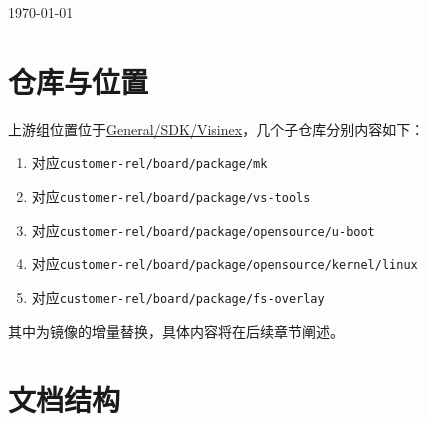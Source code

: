 \documentclass[UTF8]{ctexart}
\newcommand{\code}[1]{\colorbox{gray!10}{\lstinline[style=inlinecode]|#1|}}
\begin{document}
\vspace{\fill}

\begin{center}
    {\large \today}
\end{center}

\thispagestyle{empty}

\newpage
\pagestyle{plain}

\pagestyle{fancy}

\setlength{\headsep}{40pt}
\setlength{\footskip}{40pt}

\renewcommand\headrulewidth{.5pt}
\fancyhead{}

\renewcommand\footrulewidth{.5pt}
\fancyfoot{}
\fancyfoot[C]{\thepage}


\section*{仓库与位置}

上游组位置位于\href{http://192.168.110.252:12123/general/sdk/visinex}{General/SDK/Visinex}，几个子仓库分别内容如下：

\begin{enumerate}
    \item {}对应\code{customer-rel/board/package/mk}
    \item {}对应\code{customer-rel/board/package/vs-tools}
    \item {}对应\code{customer-rel/board/package/opensource/u-boot}
    \item {}对应\code{customer-rel/board/package/opensource/kernel/linux}
    \item {}对应\code{customer-rel/board/package/fs-overlay}
\end{enumerate}

\noindent 其中为镜像的增量替换，具体内容将在后续章节阐述。

\section*{文档结构}
\end{document}

